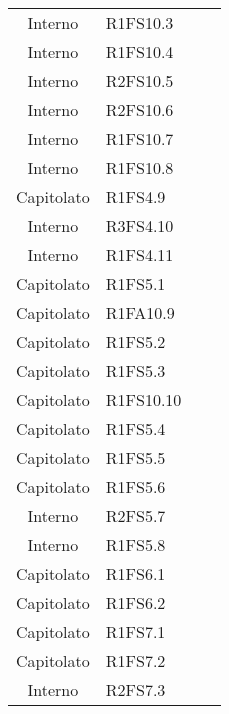 {\begin{longtable}{ c C{4cm} c c}

Interno & R1FS10.3\\

Interno & R1FS10.4\\

Interno & R2FS10.5\\

Interno & R2FS10.6\\

Interno & R1FS10.7\\

Interno & R1FS10.8\\

Capitolato & R1FS4.9\\


Interno & R3FS4.10\\

Interno & R1FS4.11\\

Capitolato & R1FS5.1\\

Capitolato & R1FA10.9\\

Capitolato & R1FS5.2\\

Capitolato & R1FS5.3\\

Capitolato & R1FS10.10\\

Capitolato & R1FS5.4\\

Capitolato & R1FS5.5\\


Capitolato & R1FS5.6\\

Interno & R2FS5.7\\

Interno & R1FS5.8\\

Capitolato & R1FS6.1\\

Capitolato & R1FS6.2\\

Capitolato & R1FS7.1\\

Capitolato & R1FS7.2\\

Interno & R2FS7.3\\


\end{longtable}}
